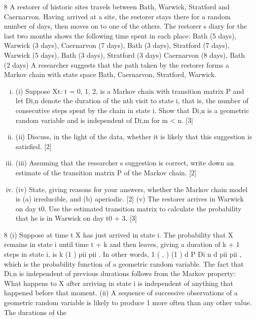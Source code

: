 \documentclass[a4paper,12pt]{article}
\begin{document}
\begin{enumerate}
8 A restorer of historic sites travels between Bath, Warwick, Stratford and Caernarvon.
Having arrived at a site, the restorer stays there for a random number of days, then
moves on to one of the others. The restorer s diary for the last two months shows the following time spent in each place:
Bath (5 days), Warwick (3 days), Caernarvon (7 days), Bath (3 days),
Stratford (7 days), Warwick (5 days), Bath (3 days), Stratford (3 days)
Caernarvon (8 days), Bath (2 days)
A researcher suggests that the path taken by the restorer forms a Markov chain with state space {Bath, Caernarvon, Stratford, Warwick}.

\begin{enumerate}[(i)]
\item (i) Suppose {Xt: t = 0, 1, 2, } is a Markov chain with transition matrix P and let Di,n denote the duration of the nth visit to state i, that is, the number of
consecutive steps spent by the chain in state i. Show that Di,n is a geometric
random variable and is independent of Di,m for m < n. [3]
\item (ii) Discuss, in the light of the data, whether it is likely that this suggestion is
satisfied. [2]
\item (iii) Assuming that the researcher s suggestion is correct, write down an estimate
of the transition matrix P of the Markov chain. [2]
\item (iv) State, giving reasons for your answers, whether the Markov chain model is
(a) irreducible, and (b) aperiodic. [2]
(v) The restorer arrives in Warwick on day t0. Use the estimated transition matrix
to calculate the probability that he is in Warwick on day t0 + 3. [3]
\end{enumerate}
8 (i) Suppose at time t X has just arrived in state i. The probability that X remains
in state i until time t + k and then leaves, giving a duration of k + 1 steps in
state i, is k (1 )
pii pii . In other words, 1
( , ) (1 ) d
P Di n d pii pii , which is
the probability function of a geometric random variable.
The fact that Di,n is independent of previous durations follows from the
Markov property: What happens to X after arriving in state i is independent of
anything that happened before that moment.
(ii) A sequence of successive observations of a geometric random variable is
likely to produce 1 more often than any other value. The durations of the

\end{enumerate}
\end{document}

